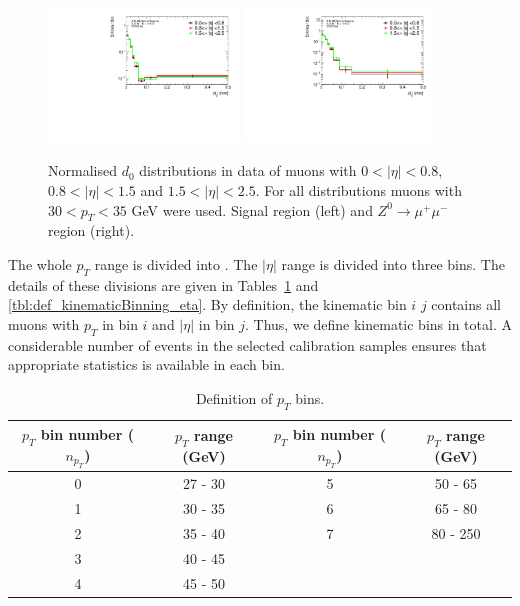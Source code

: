 \begin{figure}[htbp]
\centering
\includegraphics[width=0.45\textwidth]{figures/ZR/d0_smearing/twoplots_TwoPlots_eta-fit_fabs_lep_0_trk_d0_cor-SR-mu.pdf}
\includegraphics[width=0.45\textwidth]{figures/ZR/d0_smearing/twoplots_TwoPlots_eta-fit_fabs_lep_0_trk_d0_cor-ZR-mu.pdf}
\caption{
  Normalised $d_0$ distributions in data of muons with $0 < |\eta| < 0.8$, $0.8 < |\eta| < 1.5$ and $1.5 < |\eta| < 2.5$. 
  For all distributions muons with $30 < p_T < 35$ GeV were used.
  Signal region (left) and $Z^{0}\rightarrow\mu^{+}\mu^{-}$ region (right).
}
\label{fig:d0_2015_etaDep}
\end{figure}

The whole $p_T$ range is divided into .
The $|\eta|$ range is divided into three bins.
The details of these divisions are given in Tables~\ref{tbl:def_kinematicBinning_pT} and \ref{tbl:def_kinematicBinning_eta}.
By definition, the kinematic bin $i$ $j$ contains all muons with $p_T$ in bin $i$ and $|\eta|$ in bin $j$.
Thus, we define  kinematic bins in total.
A considerable number of events in the selected calibration samples ensures that appropriate statistics is available in each bin.

\begin{table}[h]
\begin{center}
 \begin{tabular}{ c | c | c | c } 
 \hline
 $p_T$ bin number ($n_{p_T}$) & $p_T$ range (GeV) & $p_T$ bin number ($n_{p_T}$) & $p_T$ range (GeV) \\
 \hline
 0 & 27 - 30 & 5 & 50 - 65 \\
 1 & 30 - 35 & 6 & 65 - 80 \\
 2 & 35 - 40 & 7 & 80 - 250\\
 3 & 40 - 45 & & \\ %
 4 & 45 - 50 & & \\
 \hline
\end{tabular}
\caption{
    Definition of $p_T$ bins.
}%
\label{tbl:def_kinematicBinning_pT}
\end{center}
\end{table}

